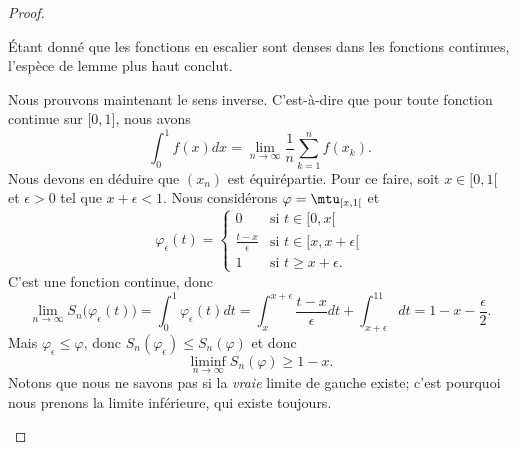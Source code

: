 \begin{proof}
\begin{subproof}
		Étant donné que les fonctions en escalier sont denses dans les fonctions continues, l'espèce de lemme plus haut conclut.

		\spitem[\ref{ItemKWcZTHqii}\( \Rightarrow\)\ref{ItemKWcZTHqi}]
		Nous prouvons maintenant le sens inverse. C'est-à-dire que pour toute fonction continue sur \( \mathopen[ 0 , 1 \mathclose]\), nous avons
		\begin{equation}
			\int_0^1f(x)dx=\lim_{n\to \infty} \frac{1}{ n }\sum_{k=1}^nf(x_k).
		\end{equation}
		Nous devons en déduire que \( (x_n)\) est équirépartie. Pour ce faire, soit \( x\in \mathopen[ 0 , 1 [\) et \( \epsilon>0\) tel que \( x+\epsilon<1\). Nous considérons \( \varphi=\mtu_{\mathopen[ x , 1 [}\) et
		\begin{equation}
			\varphi_{\epsilon}(t)=\begin{cases}
				0                        & \text{si } t\in\mathopen[ 0 , x [           \\
				\frac{ t-x }{ \epsilon } & \text{si } t\in \mathopen[ x , x+\epsilon [ \\
				1                        & \text{si } t\geq x+\epsilon.
			\end{cases}
		\end{equation}
		C'est une fonction continue, donc
		\begin{equation}
			\lim_{n\to \infty} S_n\big( \varphi_{\epsilon}(t) \big)=\int_0^1\varphi_{\epsilon}(t)dt=\int_{x}^{x+\epsilon}\frac{ t-x }{ \epsilon }dt+\int_{x+\epsilon}^11dt=1-x-\frac{ \epsilon }{2}.
		\end{equation}
		Mais \( \varphi_{\epsilon}\leq \varphi\), donc \( S_n(\varphi_{\epsilon})\leq S_n(\varphi)\) et donc
		\begin{equation}
			\liminf_{n\to \infty}S_n(\varphi)\geq 1-x.
		\end{equation}
		Notons que nous ne savons pas si la \emph{vraie} limite de gauche existe; c'est pourquoi nous prenons la limite inférieure, qui existe toujours.


\end{subproof}
\end{proof}

